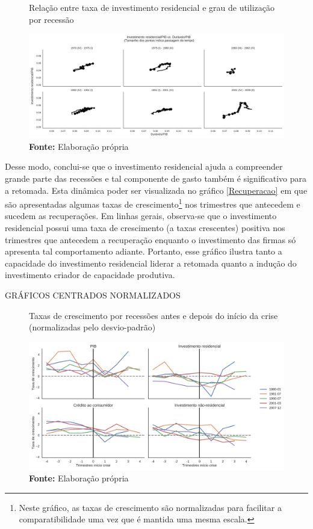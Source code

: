 \begin{figure}[htb]
	\centering
	\caption{Relação entre taxa de investimento residencial e grau de utilização por recessão}
	\label{FigInvesto_Duraveis}
	\includegraphics[width=\textwidth]{../../Dados/Fatos_Estilizados/figs/Ciclo_Ih_Duraveis.png}
	\caption*{\textbf{Fonte:} Elaboração própria}
\end{figure}

Desse modo, conclui-se que o investimento residencial ajuda a compreender grande parte das recessões e tal componente de gasto também é significativo para a retomada. Esta dinâmica poder ser visualizada no gráfico \ref{Recuperacao} em que são apresentadas algumas taxas de crescimento\footnote{Neste gráfico, as taxas de crescimento são normalizadas para facilitar a comparatibilidade uma vez que é mantida uma mesma escala.} nos trimestres que antecedem e sucedem as recuperações. Em linhas gerais, observa-se que o investimento residencial possui uma taxa de crescimento (a taxas crescentes) positiva nos trimestres que antecedem a recuperação enquanto o investimento das firmas só apresenta tal comportamento adiante. Portanto, esse gráfico ilustra tanto a capacidade do investimento residencial liderar a retomada quanto a indução do investimento criador de capacidade produtiva.

GRÁFICOS CENTRADOS NORMALIZADOS

\begin{figure}[htb]
	\centering
	\caption{Taxas de crescimento por recessões antes e depois do início da crise (normalizadas pelo desvio-padrão)}
	\label{FigCriseNorm}
	\includegraphics[width=\textwidth]{../../Dados/Fatos_Estilizados/figs/Centrado_Inicio_Norm.png}
	\caption*{\textbf{Fonte:} Elaboração própria}
\end{figure}

